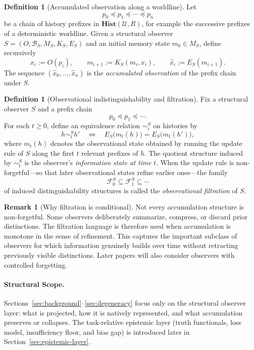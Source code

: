 \documentclass[11pt,twoside]{article}
\theoremstyle{definition}
\newtheorem{definition}[theorem]{Definition}
\newtheorem{remark}[theorem]{Remark}
\newcommand{\Hist}{\mathbf{Hist}}
\begin{document}
\begin{definition}[Accumulated observation along a worldline]
\label{def:accumulated-observation}
Let
\[
  p_0 \preceq p_1 \preceq \cdots \preceq p_n
\]
be a chain of history prefixes in \(\Hist(\mathcal{U},R)\), for example the successive prefixes of a deterministic worldline. Given a structural observer \(S=(O,\mathcal{B}_S,M_S,K_S,E_S)\) and an initial memory state \(m_0\in M_S\), define recursively
\[
  x_i := O(p_i), \qquad
  m_{i+1} := K_S(m_i, x_i), \qquad
  \widehat{x}_i := E_S(m_{i+1}).
\]
The sequence \((\widehat{x}_0,\ldots,\widehat{x}_n)\) is the \emph{accumulated observation} of the prefix chain under \(S\).
\end{definition}

\begin{definition}[Observational indistinguishability and filtration]
\label{def:obs-filtration}
Fix a structural observer \(S\) and a prefix chain
\[
  p_0 \preceq p_1 \preceq \cdots .
\]
For each \(t\ge 0\), define an equivalence relation \(\sim_t^S\) on histories by
\[
  h \sim_t^S h'
  \quad\Longleftrightarrow\quad
  E_S\!\bigl(m_t(h)\bigr) = E_S\!\bigl(m_t(h')\bigr),
\]
where \(m_t(h)\) denotes the observational state obtained by running the update rule of \(S\) along the first \(t\) relevant prefixes of \(h\). The quotient structure induced by \(\sim_t^S\) is the observer's \emph{information state at time \(t\)}. When the update rule is non-forgetful---so that later observational states refine earlier ones---the family
\[
  \mathcal{F}_0^S \subseteq \mathcal{F}_1^S \subseteq \cdots
\]
of induced distinguishability structures is called the \emph{observational filtration} of \(S\).
\end{definition}

\begin{remark}[Why filtration is conditional]
\label{rem:filtration-conditional}
Not every accumulation structure is non-forgetful. Some observers deliberately summarize, compress, or discard prior distinctions. The filtration language is therefore used when accumulation is monotone in the sense of refinement. This captures the important subclass of observers for which information genuinely builds over time without retracting previously visible distinctions. Later papers will also consider observers with controlled forgetting.
\end{remark}

\paragraph{Structural Scope.}
Sections~\ref{sec:background}--\ref{sec:degeneracy} focus only on the structural observer layer: what is projected, how it is natively represented, and what accumulation preserves or collapses. The task-relative epistemic layer (truth functionals, loss model, insufficiency floor, and bias gap) is introduced later in Section~\ref{sec:epistemic-layer}.
\end{document}
